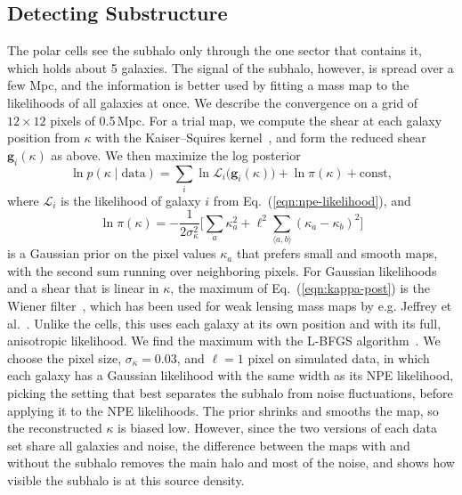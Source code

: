 \subsection{Detecting Substructure}
\label{ssec:substructure}

The polar cells see the subhalo only through the one sector that contains it, which holds about 5 galaxies. The signal of the subhalo, however, is spread over a few Mpc, and the information is better used by fitting a mass map to the likelihoods of all galaxies at once. We describe the convergence on a grid of $12\times12$ pixels of 0.5\,Mpc. For a trial map, we compute the shear at each galaxy position from $\kappa$ with the Kaiser--Squires kernel~\citep{KS93}, and form the reduced shear $\mathbf{g}_i(\kappa)$ as above. We then maximize the log posterior
\begin{equation}
\label{eqn:kappa-post}
    \ln p(\kappa \mid \text{data}) = \sum_i \ln \mathcal{L}_i\big(\mathbf{g}_i(\kappa)\big) + \ln \pi(\kappa) + \mathrm{const},
\end{equation}
where $\mathcal{L}_i$ is the likelihood of galaxy $i$ from Eq.~(\ref{eqn:npe-likelihood}), and
\begin{equation}
\label{eqn:kappa-prior}
    \ln \pi(\kappa) = - \frac{1}{2\sigma_\kappa^2}\Big[\sum_a \kappa_a^2 + \ell^2 \sum_{\langle a,b \rangle} (\kappa_a - \kappa_b)^2\Big]
\end{equation}
is a Gaussian prior on the pixel values $\kappa_a$ that prefers small and smooth maps, with the second sum running over neighboring pixels. For Gaussian likelihoods and a shear that is linear in $\kappa$, the maximum of Eq.~(\ref{eqn:kappa-post}) is the Wiener filter~\citep{Zaroubi95}, which has been used for weak lensing mass maps by e.g. Jeffrey et al.~\citep{Jeffrey18}. Unlike the cells, this uses each galaxy at its own position and with its full, anisotropic likelihood. We find the maximum with the L-BFGS algorithm~\citep{LBFGS}. We choose the pixel size, $\sigma_\kappa = 0.03$, and $\ell = 1$ pixel on simulated data, in which each galaxy has a Gaussian likelihood with the same width as its NPE likelihood, picking the setting that best separates the subhalo from noise fluctuations, before applying it to the NPE likelihoods. The prior shrinks and smooths the map, so the reconstructed $\kappa$ is biased low. However, since the two versions of each data set share all galaxies and noise, the difference between the maps with and without the subhalo removes the main halo and most of the noise, and shows how visible the subhalo is at this source density.

